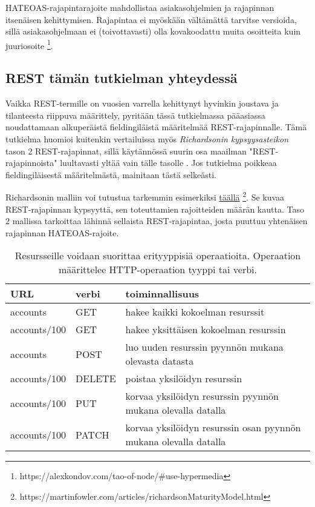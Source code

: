 HATEOAS-rajapintarajoite mahdollistaa asiakasohjelmien ja rajapinnan itsenäisen kehittymisen. Rajapintaa ei myöskään vältämättä tarvitse versioida, sillä asiakasohjelmaan ei (toivottavasti) olla kovakoodattu muita osoitteita kuin juuriosoite \footnote{https://alexkondov.com/tao-of-node/\#use-hypermedia}. 

\subsection{REST tämän tutkielman yhteydessä}
\label{REST tämän tutkielman yhteydessä}

Vaikka REST-termille on vuosien varrella kehittynyt hyvinkin joustava ja tilanteesta riippuva määrittely, pyritään tässä tutkielmassa pääasiassa noudattamaan alkuperäistä fieldingiläistä määritelmää REST-rajapinnalle. Tämä tutkielma huomioi kuitenkin vertailuissa myös \textit{Richardsonin kypsyysasteikon} tason 2 REST-rajapinnat, sillä käytännössä suurin osa maailman "REST-rajapinnoista" luultavasti yltää vain tälle tasolle \cite{rmm, tao-of-node, fullstack-rest}. Jos tutkielma poikkeaa fieldingiläisestä määritelmästä, mainitaan tästä selkeästi.

Richardsonin malliin voi tutustua tarkemmin esimerkiksi   \href{https://martinfowler.com/articles/richardsonMaturityModel.html}{täällä} \footnote{https://martinfowler.com/articles/richardsonMaturityModel.html}. Se kuvaa REST-rajapinnan kypsyyttä, sen toteuttamien rajoitteiden määrän kautta. Taso 2 mallissa tarkoittaa lähinnä sellaista REST-rajapintaa, josta puuttuu yhtenäisen rajapinnan HATEOAS-rajoite. \cite{rmm}

\begin{table}[h!]
\begin{tabular}{|l|l|l|}
\hline
\textbf{URL}  & \textbf{verbi} & \textbf{toiminnallisuus}                                          \\ \hline
accounts     & GET            & hakee kaikki kokoelman resurssit                                 \\ \hline
accounts/100 & GET            & hakee yksittäisen kokoelman resurssin                            \\ \hline
accounts     & POST           & luo uuden resurssin pyynnön mukana olevasta datasta              \\ \hline
accounts/100 & DELETE          & poistaa yksilöidyn resurssin                                     \\ \hline
accounts/100 & PUT            & korvaa yksilöidyn resurssin pyynnön mukana olevalla datalla      \\ \hline
accounts/100 & PATCH          & korvaa yksilöidyn resurssin osan pyynnön mukana olevalla datalla \\ \hline
\end{tabular}
\caption{Resursseille voidaan suorittaa erityyppisiä operaatioita. Operaation määrittelee HTTP-operaation tyyppi tai verbi.}
\label{table:1}
\end{table}

